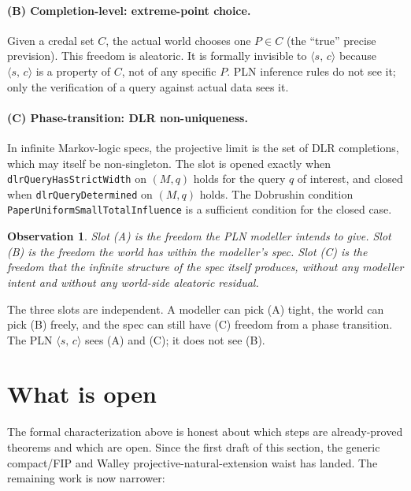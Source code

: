 \documentclass[]{article}
\newtheorem{observation}[theorem]{Observation}
\newcommand{\lid}[1]{{\ttfamily\nolinkurl{#1}}}
\newcommand{\STV}[2]{\langle #1,\, #2 \rangle}
\begin{document}
\paragraph{(B) Completion-level: extreme-point choice.}
Given a credal set $C$, the actual world chooses one $P \in C$ (the
``true'' precise prevision). This freedom is aleatoric. It is formally
invisible to $\STV{s}{c}$ because $\STV{s}{c}$ is a property of $C$, not
of any specific $P$. PLN inference rules do not see it; only the
verification of a query against actual data sees it.

\paragraph{(C) Phase-transition: DLR non-uniqueness.}
In infinite Markov-logic specs, the projective limit is the set of DLR
completions, which may itself be non-singleton. The slot is opened
exactly when \lid{dlrQueryHasStrictWidth} on $(M, q)$ holds for the
query $q$ of interest, and closed when \lid{dlrQueryDetermined} on $(M, q)$
holds. The Dobrushin condition \lid{PaperUniformSmallTotalInfluence}
is a sufficient condition for the closed case.

\begin{observation}
Slot (A) is the freedom the PLN modeller intends to give. Slot (B) is
the freedom the world has within the modeller's spec. Slot (C) is the
freedom that the infinite structure of the spec itself produces, without
any modeller intent and without any world-side aleatoric residual.
\end{observation}

The three slots are independent. A modeller can pick (A) tight, the
world can pick (B) freely, and the spec can still have (C) freedom from
a phase transition. The PLN $\STV{s}{c}$ sees (A) and (C); it does not
see (B).

\section{What is open}\label{sec:open}

The formal characterization above is honest about which steps are
already-proved theorems and which are open. Since the first draft of this
section, the generic compact/FIP and Walley projective-natural-extension
waist has landed. The remaining work is now narrower:
\end{document}
